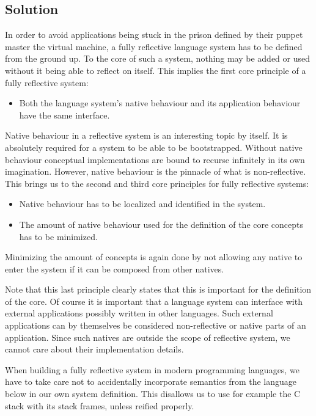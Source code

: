 \documentclass{article}
\begin{document}
\subsection{Solution}
In order to avoid applications being stuck in the prison defined by
their puppet master the virtual machine, a fully reflective language
system has to be defined from the ground up. To the core of such a
system, nothing may be added or used without it being able to reflect
on itself. This implies the first core principle of a fully reflective
system:

\begin{itemize}
    \item Both the language system's native behaviour and its
          application behaviour have the same interface.
\end{itemize}

Native behaviour in a reflective system is an interesting topic by
itself. It is absolutely required for a system to be able to be
bootstrapped. Without native behaviour conceptual implementations
are bound to recurse infinitely in its own imagination. However,
native behaviour is the pinnacle of what is non-reflective. This
brings us to the second and third core principles for fully
reflective systems:

\begin{itemize}
    \item Native behaviour has to be localized and identified in the
          system.
    \item The amount of native behaviour used for the definition of
          the core concepts has to be minimized.
\end{itemize}

Minimizing the amount of concepts is again done by not allowing any
native to enter the system if it can be composed from other natives.

Note that this last principle clearly states that this is important
for the definition of the core. Of course it is important that a
language system can interface with external applications possibly
written in other languages. Such external applications can by
themselves be considered non-reflective or native parts of an
application. Since such natives are outside the scope of reflective
system, we cannot care about their implementation details.

When building a fully reflective system in modern programming
languages, we have to take care not to accidentally incorporate
semantics from the language below in our own system definition. This
disallows us to use for example the C stack with its stack frames,
unless reified properly. 
\end{document}
